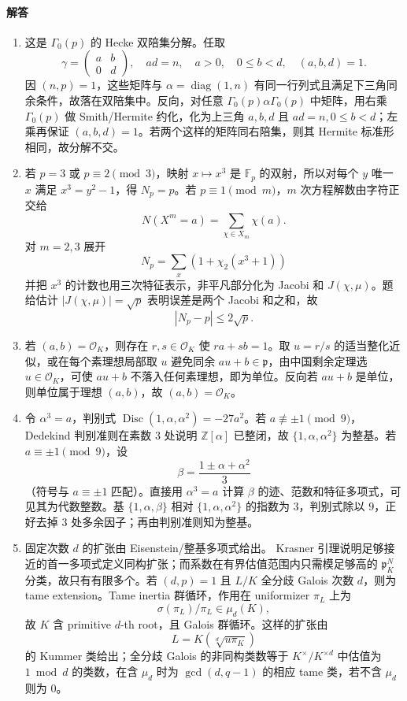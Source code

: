 \documentclass[UTF8,12pt]{ctexart}
\begin{document}
\paragraph{解答}
\begin{enumerate}[label=\textbf{\arabic*.},leftmargin=2.2em]
\item 这是 \(\Gamma_0(p)\) 的 Hecke 双陪集分解。任取
\[
\gamma=\begin{pmatrix}a&b\\0&d\end{pmatrix},\quad ad=n,\quad a>0,\quad0\le b<d,\quad (a,b,d)=1.
\]
因 \((n,p)=1\)，这些矩阵与 \(\alpha=\operatorname{diag}(1,n)\) 有同一行列式且满足下三角同余条件，故落在双陪集中。反向，对任意 \(\Gamma_0(p)\alpha\Gamma_0(p)\) 中矩阵，用右乘 \(\Gamma_0(p)\) 做 Smith/Hermite 约化，化为上三角 \(a,b,d\) 且 \(ad=n,0\le b<d\)；左乘再保证 \((a,b,d)=1\)。若两个这样的矩阵同右陪集，则其 Hermite 标准形相同，故分解不交。
\item 若 \(p=3\) 或 \(p\equiv2\pmod3\)，映射 \(x\mapsto x^3\) 是 \(\mathbb F_p\) 的双射，所以对每个 \(y\) 唯一 \(x\) 满足 \(x^3=y^2-1\)，得 \(N_p=p\)。若 \(p\equiv1\pmod m\)，\(m\) 次方程解数由字符正交给
\[
N(X^m=a)=\sum_{\chi\in X_m}\chi(a).
\]
对 \(m=2,3\) 展开
\[
N_p=\sum_x\left(1+\chi_2(x^3+1)\right)
\]
并把 \(x^3\) 的计数也用三次特征表示，非平凡部分化为 Jacobi 和 \(J(\chi,\mu)\)。题给估计 \(|J(\chi,\mu)|=\sqrt p\) 表明误差是两个 Jacobi 和之和，故
\[
|N_p-p|\le2\sqrt p.
\]
\item 若 \((a,b)=\mathcal O_K\)，则存在 \(r,s\in\mathcal O_K\) 使 \(ra+sb=1\)。取 \(u=r/s\) 的适当整化近似，或在每个素理想局部取 \(u\) 避免同余 \(au+b\in\mathfrak p\)，由中国剩余定理选 \(u\in\mathcal O_K\)，可使 \(au+b\) 不落入任何素理想，即为单位。反向若 \(au+b\) 是单位，则单位属于理想 \((a,b)\)，故 \((a,b)=\mathcal O_K\)。
\item 令 \(\alpha^3=a\)，判别式 \(\operatorname{Disc}(1,\alpha,\alpha^2)=-27a^2\)。若 \(a\not\equiv\pm1\pmod9\)，Dedekind 判别准则在素数 \(3\) 处说明 \(\mathbb Z[\alpha]\) 已整闭，故 \(\{1,\alpha,\alpha^2\}\) 为整基。若 \(a\equiv\pm1\pmod9\)，设
\[
\beta=\frac{1\pm\alpha+\alpha^2}{3}
\]
（符号与 \(a\equiv\pm1\) 匹配）。直接用 \(\alpha^3=a\) 计算 \(\beta\) 的迹、范数和特征多项式，可见其为代数整数。基 \(\{1,\alpha,\beta\}\) 相对 \(\{1,\alpha,\alpha^2\}\) 的指数为 \(3\)，判别式除以 \(9\)，正好去掉 \(3\) 处多余因子；再由判别准则知为整基。
\item 固定次数 \(d\) 的扩张由 Eisenstein/整基多项式给出。 Krasner 引理说明足够接近的首一多项式定义同构扩张；而系数在有界估值范围内只需模足够高的 \(\mathfrak p_K^N\) 分类，故只有有限多个。若 \((d,p)=1\) 且 \(L/K\) 全分歧 Galois 次数 \(d\)，则为 tame extension。Tame inertia 群循环，作用在 uniformizer \(\pi_L\) 上为
\[
\sigma(\pi_L)/\pi_L\in\mu_d(K),
\]
故 \(K\) 含 primitive \(d\)-th root，且 Galois 群循环。这样的扩张由
\[
L=K(\sqrt[d]{u\pi_K})
\]
的 Kummer 类给出；全分歧 Galois 的非同构类数等于 \(K^\times/K^{\times d}\) 中估值为 \(1\bmod d\) 的类数，在含 \(\mu_d\) 时为 \(\gcd(d,q-1)\) 的相应 tame 类，若不含 \(\mu_d\) 则为 \(0\)。
\end{enumerate}
\end{document}

